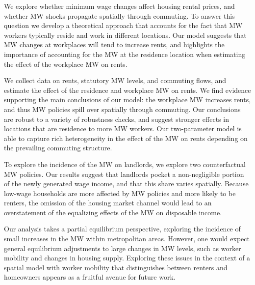 
We explore whether minimum wage changes affect housing rental prices, and 
whether MW shocks propagate spatially through commuting.
To answer this question we develop a theoretical approach that accounts for
the fact that MW workers typically reside and work in different locations.
Our model suggests that MW changes at workplaces will tend to increase
rents, and highlights the importance of accounting for the MW at the residence
location when estimating the effect of the workplace MW on rents.

We collect data on rents, statutory MW levels, and commuting flows, and estimate 
the effect of the residence and workplace MW on rents.
We find evidence supporting the main conclusions of our model: the workplace MW
increases rents, and thus MW policies spill over spatially through commuting.
Our conclusions are robust to a variety of robustness checks, and suggest
stronger effects in locations that are residence to more MW workers.
Our two-parameter model is able to capture rich heterogeneity in the effect 
of the MW on rents depending on the prevailing commuting structure.

To explore the incidence of the MW on landlords, we explore two counterfactual 
MW policies.
Our results suggest that landlords pocket a non-negligible portion of the newly 
generated wage income, and that this share varies spatially.
Because low-wage households are more affected by MW policies and more likely to 
be renters,
the omission of the housing market channel would lead to an overstatement of the 
equalizing effects of the MW on disposable income.

Our analysis takes a partial equilibrium perspective, exploring the incidence 
of small increases in the MW within metropolitan areas.
However, one would expect general equilibrium adjustments to large changes 
in MW levels, such as worker mobility and changes in housing supply.
Exploring these issues in the context of a spatial model with worker mobility
that distinguishes between renters and homeowners appears as a fruitful 
avenue for future work.

